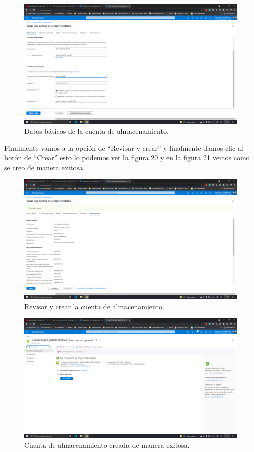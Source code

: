 \documentclass[11pt]{article}
\begin{document}
				\begin{figure}[H]
					\centering
					\includegraphics[scale=0.34]{resources/almacenamiento2.png}
					\caption{Datos básicos de la cuenta de almacenamiento.}\label{fig:picture}
				\end{figure}
			Finalmente vamos a la opción de ``Revisar y crear'' y finalmente damos clic al botón de ``Crear'' esto lo podemos ver la figura 20 y en la figura 21 vemos como se creo de manera exitosa.
				\begin{figure}[H]
					\centering
					\includegraphics[scale=0.34]{resources/almacenamiento3.png}
					\caption{Revisar y crear la cuenta de almacenamiento.}\label{fig:picture}
				\end{figure}
				\begin{figure}[H]
					\centering
					\includegraphics[scale=0.34]{resources/almacenamientoF.png}
					\caption{Cuenta de almacenamiento creada de manera exitosa.}\label{fig:picture}
				\end{figure}
\end{document}
